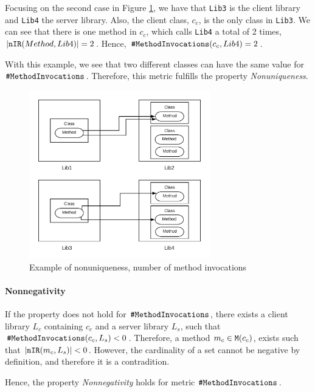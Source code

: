 Focusing on the second case in Figure \ref{fig:example-nonuniqueness-method-invocation}, we have that \texttt{Lib3} is the client library and \texttt{Lib4} the server library. Also, the client class, $c_c$, is the only class in \texttt{Lib3}. We can see that there is one method in $c_c$, which calls \texttt{Lib4} a total of 2 times, $|\verb|nIR|(Method, Lib4)| = 2$. Hence, $\verb|#MethodInvocations|(c_c, Lib4) = 2$.

With this example, we see that two different classes can have the same value for $\verb|#MethodInvocations|$. Therefore, this metric fulfills the property \textit{Nonuniqueness}.

\begin{figure}[ht]
\begin{center}
\includegraphics[width=0.7\textwidth]{figures/Example-Distribution-2.png}
\caption{Example of nonuniqueness, number of method invocations}
\label{fig:example-nonuniqueness-method-invocation}
\end{center}
\end{figure}

\paragraph{Nonnegativity}
If the property does not hold for $\verb|#MethodInvocations|$, there exists a client library $L_c$ containing $c_c$ and a server library $L_s$, such that $\verb|#MethodInvocations|(c_c, L_s)
< 0$. Therefore, a method $m_c \in \verb|M|(c_c)$, exists such that $|\verb|nIR|(m_c, L_s)| < 0$. However, the cardinality of a set cannot be negative by definition, and therefore it is a contradition.

Hence, the property \textit{Nonnegativity} holds for metric $\verb|#MethodInvocations|$.

